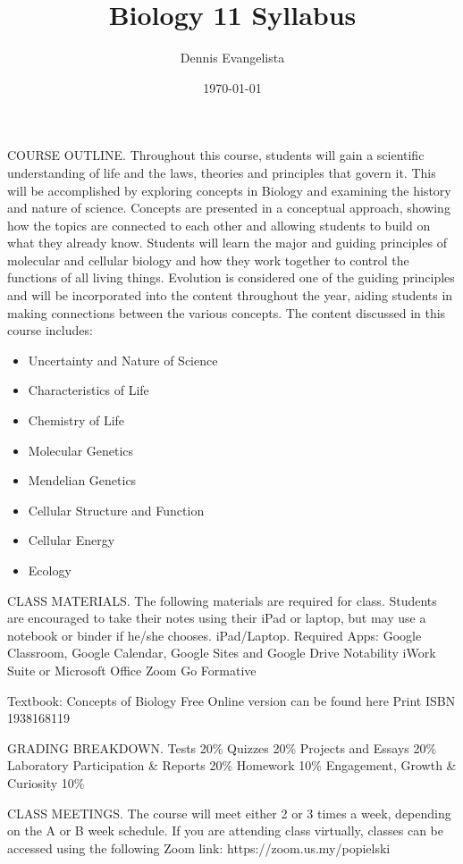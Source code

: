\documentclass{article}
\title{Biology 11 Syllabus}
\author{Dennis Evangelista}
\date{\today}
\begin{document}

COURSE OUTLINE.
Throughout this course, students will gain a scientific understanding of life and the laws, theories and principles that govern it. This will be accomplished by exploring concepts in Biology and examining the history and nature of science. Concepts are presented in a conceptual approach, showing how the topics are connected to each other and allowing students to build on what they already know. Students will learn the major and guiding principles of molecular and cellular biology and how they work together to control the functions of all living things. Evolution is considered one of the guiding principles and will be incorporated into the content throughout the year, aiding students in making connections between the various concepts. The content discussed in this course includes:
\begin{itemize}
\item Uncertainty and Nature of Science
\item Characteristics of Life
\item Chemistry of Life
\item Molecular Genetics
\item Mendelian Genetics
\item Cellular Structure and Function
\item Cellular Energy
\item Ecology
\end{itemize}

CLASS MATERIALS.
The following materials are required for class. Students are encouraged to take their notes using their iPad or laptop, but may use a notebook or binder if he/she chooses.
iPad/Laptop.
Required Apps:
Google Classroom, Google Calendar, Google Sites and Google Drive
Notability
iWork Suite or Microsoft Office
Zoom
Go Formative

Textbook: Concepts of Biology
Free Online version can be found here
Print ISBN 1938168119

GRADING BREAKDOWN.
Tests 20\%
Quizzes 20\%
Projects and Essays 20\%
Laboratory Participation \& Reports 20\%
Homework 10\%
Engagement, Growth \& Curiosity 10\%

CLASS MEETINGS.
The course will meet either 2 or 3 times a week, depending on the A or B week schedule. If you are attending class virtually, classes can be accessed using the following Zoom link: https://zoom.us.my/popielski
\end{document}
